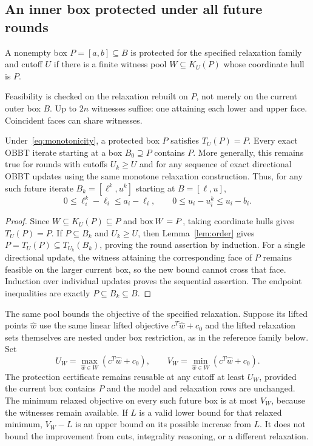 \subsection{An inner box protected under all future rounds}

\begin{definition}
A nonempty box $P=[a,b]\subseteq B$ is protected for the specified
relaxation family and cutoff $U$ if there is a finite witness pool
$W\subseteq K_U(P)$ whose coordinate hull is $P$.
\end{definition}

Feasibility is checked on the relaxation rebuilt on $P$, not merely on
the current outer box $B$. Up to $2n$ witnesses suffice: one attaining
each lower and upper face. Coincident faces can share witnesses.

\begin{theorem}\label{thm:protected}
Under~\eqref{eq:monotonicity}, a protected box $P$ satisfies
$T_U(P)=P$. Every exact OBBT iterate starting at a box $B_0\supseteq P$
contains $P$. More generally, this remains true for rounds with cutoffs
$U_k\ge U$ and for any sequence of exact directional OBBT updates using
the same monotone relaxation construction. Thus, for any such future
iterate $B_k=[\ell^k,u^k]$ starting at $B=[\ell,u]$,
\begin{equation}\label{eq:protected-ceilings}
 0\le\ell_i^k-\ell_i\le a_i-\ell_i,\qquad
 0\le u_i-u_i^k\le u_i-b_i.
\end{equation}
\end{theorem}
\begin{proof}
Since $W\subseteq K_U(P)\subseteq P$ and $\operatorname{box} W=P$, taking coordinate
hulls gives $T_U(P)=P$. If $P\subseteq B_k$ and $U_k\ge U$, then
Lemma~\ref{lem:order} gives
$P=T_U(P)\subseteq T_{U_k}(B_k)$, proving the round assertion by
induction. For a single directional update, the witness attaining the
corresponding face of $P$ remains feasible on the larger current box,
so the new bound cannot cross that face. Induction over individual
updates proves the sequential assertion. The endpoint inequalities are
exactly $P\subseteq B_k\subseteq B$.
\end{proof}

The same pool bounds the objective of the specified relaxation. Suppose
its lifted points $\widehat w$ use the same linear lifted objective
$c^T\widehat w+c_0$ and the lifted relaxation sets themselves are nested
under box restriction, as in the reference family below. Set
\begin{equation}\label{eq:thresholds}
 U_W=\max_{\widehat w\in W}(c^T\widehat w+c_0),\qquad
 V_W=\min_{\widehat w\in W}(c^T\widehat w+c_0).
\end{equation}
The protection certificate remains reusable at any cutoff at least
$U_W$, provided the current box contains $P$ and the model and relaxation
rows are unchanged. The minimum relaxed objective on every such future
box is at most $V_W$, because the witnesses remain available.
If $L$ is a valid lower bound for that relaxed minimum, $V_W-L$ is an
upper bound on its possible increase from $L$. It does not bound the
improvement from cuts, integrality reasoning, or a different relaxation.

